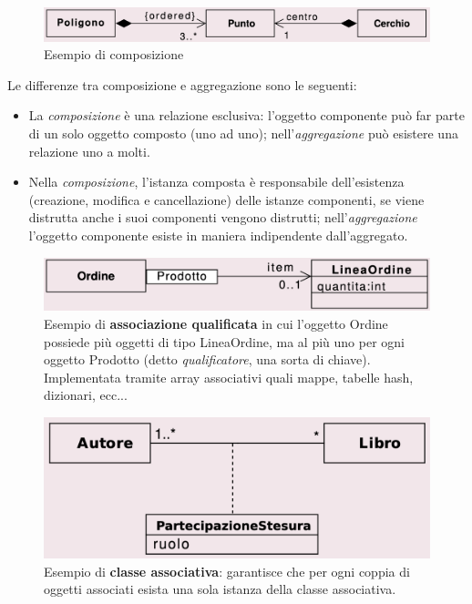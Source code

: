 \begin{figure}[H]
    \centering
    \includegraphics[width=1\linewidth]{assets/UML/class/class-7.png}
    \caption{Esempio di composizione}
\end{figure}
Le differenze tra composizione e aggregazione sono le seguenti:
\begin{itemize}
    \item La \textit{composizione} è una relazione esclusiva: l'oggetto componente può far parte di un solo oggetto composto (uno ad uno); nell'\textit{aggregazione} può esistere una relazione uno a molti.
    \item Nella \textit{composizione}, l'istanza composta è responsabile dell'esistenza (creazione, modifica e cancellazione) delle istanze componenti, se viene distrutta anche i suoi componenti vengono distrutti; nell'\textit{aggregazione} l'oggetto componente esiste in maniera indipendente dall'aggregato.
\end{itemize}

\begin{figure}[H]
    \centering
    \includegraphics[width=1\linewidth]{assets/UML/class/class-12.png}
    \caption{Esempio di \textbf{associazione qualificata} in cui l'oggetto Ordine possiede più oggetti di tipo LineaOrdine, ma al più uno per ogni oggetto Prodotto (detto \textit{qualificatore}, una sorta di chiave). Implementata tramite array associativi quali mappe, tabelle hash, dizionari, ecc...}
\end{figure}

\vspace{20pt}

\begin{figure}[H]
    \centering
    \includegraphics[width=1\linewidth]{assets/UML/class/class-13.png}
    \caption{Esempio di \textbf{classe associativa}: garantisce che per ogni coppia di oggetti associati esista una sola istanza della classe associativa.}
\end{figure}

